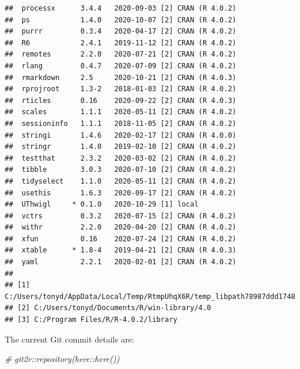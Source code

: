 \documentclass[]{elsarticle} %
\newenvironment{Shaded}{\begin{snugshade}}{\end{snugshade}}
\newcommand{\CommentTok}[1]{\textcolor[rgb]{0.56,0.35,0.01}{\textit{#1}}}
\begin{document}
\begin{verbatim}
##  processx      3.4.4   2020-09-03 [2] CRAN (R 4.0.2)
##  ps            1.4.0   2020-10-07 [2] CRAN (R 4.0.2)
##  purrr         0.3.4   2020-04-17 [2] CRAN (R 4.0.2)
##  R6            2.4.1   2019-11-12 [2] CRAN (R 4.0.2)
##  remotes       2.2.0   2020-07-21 [2] CRAN (R 4.0.2)
##  rlang         0.4.7   2020-07-09 [2] CRAN (R 4.0.2)
##  rmarkdown     2.5     2020-10-21 [2] CRAN (R 4.0.3)
##  rprojroot     1.3-2   2018-01-03 [2] CRAN (R 4.0.2)
##  rticles       0.16    2020-09-22 [2] CRAN (R 4.0.3)
##  scales        1.1.1   2020-05-11 [2] CRAN (R 4.0.2)
##  sessioninfo   1.1.1   2018-11-05 [2] CRAN (R 4.0.2)
##  stringi       1.4.6   2020-02-17 [2] CRAN (R 4.0.0)
##  stringr       1.4.0   2019-02-10 [2] CRAN (R 4.0.2)
##  testthat      2.3.2   2020-03-02 [2] CRAN (R 4.0.2)
##  tibble        3.0.3   2020-07-10 [2] CRAN (R 4.0.2)
##  tidyselect    1.1.0   2020-05-11 [2] CRAN (R 4.0.2)
##  usethis       1.6.3   2020-09-17 [2] CRAN (R 4.0.2)
##  UThwigl     * 0.1.0   2020-10-29 [1] local         
##  vctrs         0.3.2   2020-07-15 [2] CRAN (R 4.0.2)
##  withr         2.2.0   2020-04-20 [2] CRAN (R 4.0.2)
##  xfun          0.16    2020-07-24 [2] CRAN (R 4.0.2)
##  xtable      * 1.8-4   2019-04-21 [2] CRAN (R 4.0.3)
##  yaml          2.2.1   2020-02-01 [2] CRAN (R 4.0.2)
## 
## [1] C:/Users/tonyd/AppData/Local/Temp/RtmpUhqX6R/temp_libpath78987ddd1748
## [2] C:/Users/tonyd/Documents/R/win-library/4.0
## [3] C:/Program Files/R/R-4.0.2/library
\end{verbatim}

The current Git commit details are:

\begin{Shaded}
\begin{Highlighting}[]
\CommentTok{# git2r::repository(here::here())}
\end{Highlighting}
\end{Shaded}
\end{document}
